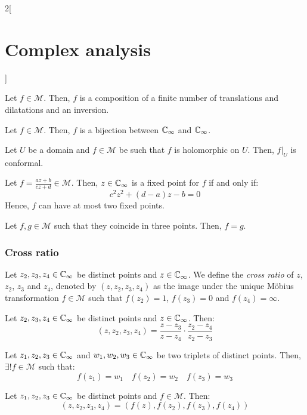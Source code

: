 \documentclass[../../../main.tex]{subfiles}
\begin{document}
\begin{multicols}{2}[\section{Complex analysis}]
\begin{theorem}
    Let $f\in\mathcal{M}$. Then, $f$ is a composition of a finite number of translations and dilatations and an inversion.
  \end{theorem}
  \begin{proposition}
    Let $f\in\mathcal{M}$. Then, $f$ is a bijection between $\mathbb{C}_\infty$ and $\mathbb{C}_\infty$.
  \end{proposition}
  \begin{proposition}
    Let $U$ be a domain and $f\in\mathcal{M}$ be such that $f$ is holomorphic on $U$. Then, $f|_{U}$ is conformal.
  \end{proposition}
  \begin{proposition}
    Let $f=\frac{az+b}{cz+d}\in\mathcal{M}$. Then, $z\in\mathbb{C}_\infty$ is a fixed point for $f$ if and only if: $$c^2z^2+(d-a)z-b=0$$
    Hence, $f$ can have at most two fixed points.
  \end{proposition}
  \begin{corollary}
    Let $f,g\in\mathcal{M}$ such that they coincide in three points. Then, $f=g$.
  \end{corollary}
  \subsubsection{Cross ratio}
  \begin{definition}
    Let $z_2,z_3,z_4\in\mathbb{C}_\infty$ be distinct points and $z\in\mathbb{C}_\infty$. We define the \emph{cross ratio} of $z$, $z_2$, $z_3$ and $z_4$, denoted by $(z,z_2,z_3,z_4)$ as the image under the unique Möbius transformation $f\in\mathcal{M}$ such that $f(z_2)=1$, $f(z_3)=0$ and $f(z_4)=\infty$.
  \end{definition}
  \begin{proposition}
    Let $z_2,z_3,z_4\in\mathbb{C}_\infty$ be distinct points and $z\in\mathbb{C}_\infty$. Then: $$(z,z_2,z_3,z_4)=\frac{z-z_3}{z-z_4}\cdot\frac{z_2-z_4}{z_2-z_3}$$
  \end{proposition}
  \begin{corollary}
    Let $z_1,z_2,z_3\in\mathbb{C}_\infty$ and $w_1,w_2,w_3\in\mathbb{C}_\infty$ be two triplets of distinct points. Then, $\exists! f\in\mathcal{M}$ such that: $$f(z_1)=w_1\quad f(z_2)=w_2\quad f(z_3)=w_3$$
  \end{corollary}
  \begin{theorem}
    Let $z_1,z_2,z_3\in\mathbb{C}_\infty$ be distinct points and $f\in\mathcal{M}$. Then: $$(z,z_2,z_3,z_4)=(f(z),f(z_2),f(z_3),f(z_4))$$
  \end{theorem}

\end{multicols}
\end{document}

